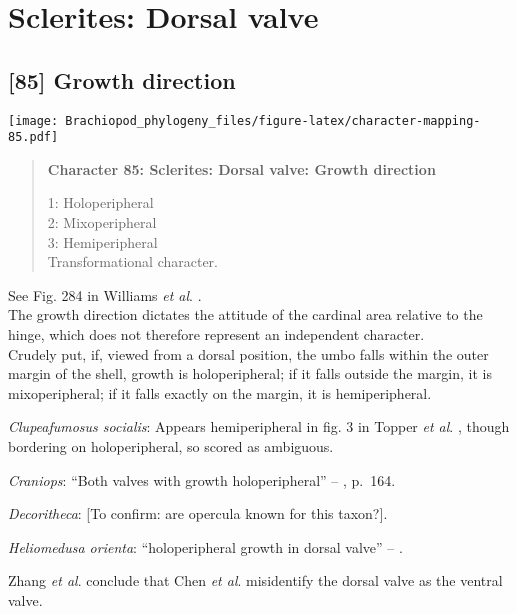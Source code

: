\documentclass[openany]{book}
\theoremstyle{definition}
\theoremstyle{definition}
\theoremstyle{definition}
\theoremstyle{remark}
\begin{document}
\section{Sclerites: Dorsal valve}\label{sclerites-dorsal-valve}

\subsection*{{[}85{]} Growth direction}\label{growth-direction}

\texttt{[image: Brachiopod\_phylogeny\_files/figure-latex/character-mapping-85.pdf]}

\begin{quote}
\textbf{Character 85: Sclerites: Dorsal valve: Growth direction}

1: Holoperipheral\\
2: Mixoperipheral\\
3: Hemiperipheral\\
Transformational character.
\end{quote}

See Fig. 284 in Williams \emph{et al}.
\citeyearpar{Williams1997Introduction}.\\
The growth direction dictates the attitude of the cardinal area relative
to the hinge, which does not therefore represent an independent
character.\\
Crudely put, if, viewed from a dorsal position, the umbo falls within
the outer margin of the shell, growth is holoperipheral; if it falls
outside the margin, it is mixoperipheral; if it falls exactly on the
margin, it is hemiperipheral.

\hypertarget{Clupeafumosus_socialis-coding-85}{}
\emph{Clupeafumosus socialis}: Appears hemiperipheral in fig. 3 in
Topper \emph{et al}. \citeyearpar{Topper2013Reappraisalof}, though
bordering on holoperipheral, so scored as ambiguous.

\hypertarget{Craniops-coding-85}{}
\emph{Craniops}: ``Both valves with growth holoperipheral'' --
\citet{Williams2000LinguliformeaCraniiformea}, p.~164.

\hypertarget{Decoritheca-coding-85}{}
\emph{Decoritheca}: {[}To confirm: are opercula known for this
taxon?{]}.

\hypertarget{Heliomedusa_orienta-coding-85}{}
\emph{Heliomedusa orienta}: ``holoperipheral growth in dorsal valve'' --
\citet{Williams2007Supplement}.

Zhang \emph{et al}. \citeyearpar{Zhang2009Architectureand} conclude that
Chen \emph{et al}. \citeyearpar{Chen2007Reinterpretationof} misidentify
the dorsal valve as the ventral valve.
\end{document}
